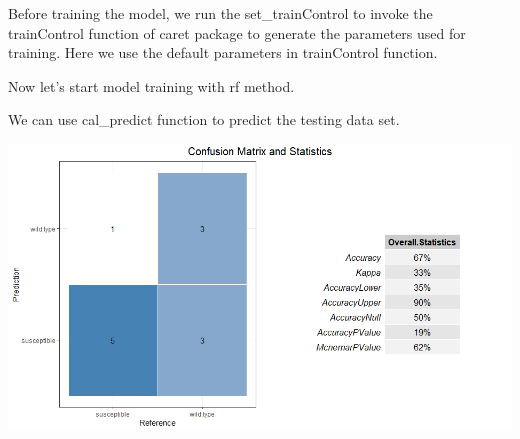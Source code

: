 \documentclass[
]{book}
\newenvironment{Shaded}{\begin{snugshade}}{\end{snugshade}}
\newcommand{\AttributeTok}[1]{\textcolor[rgb]{0.77,0.63,0.00}{#1}}
\newcommand{\CommentTok}[1]{\textcolor[rgb]{0.56,0.35,0.01}{\textit{#1}}}
\newcommand{\DecValTok}[1]{\textcolor[rgb]{0.00,0.00,0.81}{#1}}
\newcommand{\FunctionTok}[1]{\textcolor[rgb]{0.00,0.00,0.00}{#1}}
\newcommand{\NormalTok}[1]{#1}
\newcommand{\SpecialCharTok}[1]{\textcolor[rgb]{0.00,0.00,0.00}{#1}}
\begin{document}
Before training the model, we run the set\_trainControl to invoke the trainControl function of caret package to generate the parameters used for training.
Here we use the default parameters in trainControl function.

\begin{Shaded}
\end{Shaded}

Now let's start model training with rf method.

\begin{Shaded}
\end{Shaded}

We can use cal\_predict function to predict the testing data set.

\begin{Shaded}
\end{Shaded}

\begin{center}\includegraphics[width=600px]{Images/plot_confusionMatrix_without_selection} \end{center}
\end{document}
